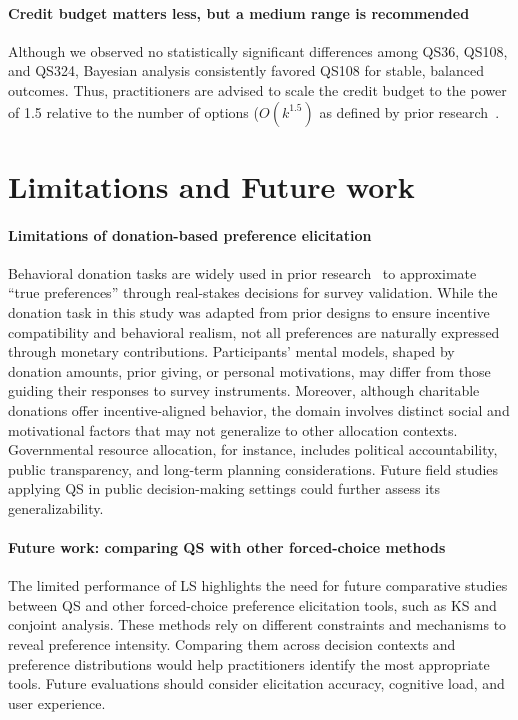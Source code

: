 \paragraph{Credit budget matters less, but a medium range is recommended}
Although we observed no statistically significant differences among QS36, QS108, and QS324, Bayesian analysis consistently favored QS108 for stable, balanced outcomes. Thus, practitioners are advised to scale the credit budget to the power of 1.5 relative to the number of options ($O(k^{1.5})$ as defined by prior research~\cite{chengCanShowWhat2021}.

\section{Limitations and Future work}
\label{sec:limitations}

\paragraph{Limitations of donation-based preference elicitation}
Behavioral donation tasks are widely used in prior research~\cite{xiao2019should, gendall2010effect, benz2008people, chengCanShowWhat2021} to approximate ``true preferences'' through real-stakes decisions for survey validation. While the donation task in this study was adapted from prior designs to ensure incentive compatibility and behavioral realism, not all preferences are naturally expressed through monetary contributions. Participants' mental models, shaped by donation amounts, prior giving, or personal motivations, may differ from those guiding their responses to survey instruments. Moreover, although charitable donations offer incentive-aligned behavior, the domain involves distinct social and motivational factors that may not generalize to other allocation contexts. Governmental resource allocation, for instance, includes political accountability, public transparency, and long-term planning considerations. Future field studies applying QS in public decision-making settings could further assess its generalizability.

\paragraph{Future work: comparing QS with other forced-choice methods}
The limited performance of LS highlights the need for future comparative studies between QS and other forced-choice preference elicitation tools, such as KS and conjoint analysis. These methods rely on different constraints and mechanisms to reveal preference intensity. Comparing them across decision contexts and preference distributions would help practitioners identify the most appropriate tools. Future evaluations should consider elicitation accuracy, cognitive load, and user experience.
